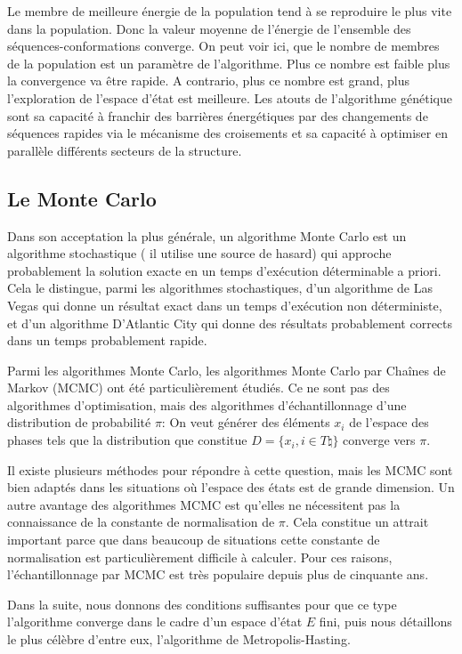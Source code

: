 Le membre de meilleure énergie de la population tend à se reproduire le plus vite dans la population. 
Donc la valeur moyenne de l'énergie de l'ensemble des séquences-conformations converge.
On peut voir ici, que le nombre de membres de la population est un paramètre de l'algorithme. Plus ce nombre est faible plus la convergence va être rapide. A contrario, plus ce nombre est grand, plus l'exploration de l'espace d'état est meilleure.
Les atouts de l'algorithme génétique sont sa capacité à franchir des barrières énergétiques par des changements de séquences rapides via le mécanisme des croisements et sa capacité à optimiser en parallèle différents secteurs de la structure.

\subsection{Le Monte Carlo}
\label{sub:MC}
Dans son acceptation la plus générale, un algorithme Monte Carlo est un algorithme stochastique ( il utilise une source de hasard) qui approche probablement la solution exacte en un temps d'exécution déterminable a priori. Cela le distingue, parmi les algorithmes stochastiques, d'un algorithme de Las Vegas qui donne un résultat exact dans un temps d'exécution non déterministe, et d'un algorithme D'Atlantic City qui donne des résultats probablement corrects dans un temps probablement rapide.

Parmi les algorithmes Monte Carlo, les algorithmes Monte Carlo par Chaînes de Markov (MCMC) ont été particulièrement étudiés.
Ce ne sont pas des algorithmes d'optimisation, mais des algorithmes d'échantillonnage d'une distribution de probabilité $\pi$: On veut générer des éléments $x_i$ de l'espace des phases tels que la distribution que constitue $D=\{x_i, i \in T \natural \}$ converge vers $\pi$.

Il existe plusieurs méthodes pour répondre à cette question, mais les MCMC sont bien adaptés dans les situations où l'espace des états est de grande dimension. Un autre avantage des algorithmes MCMC est qu'elles ne nécessitent pas la connaissance de la constante de normalisation de $\pi$. Cela constitue un attrait important parce que dans beaucoup de situations cette constante de normalisation est particulièrement difficile à calculer. Pour ces raisons, l'échantillonnage par MCMC est très populaire depuis plus de cinquante ans.

Dans la suite, nous donnons des conditions suffisantes pour que ce type l'algorithme converge dans le cadre d'un espace d'état $E$ fini, puis nous détaillons le plus célèbre d'entre eux, l'algorithme de Metropolis-Hasting.

